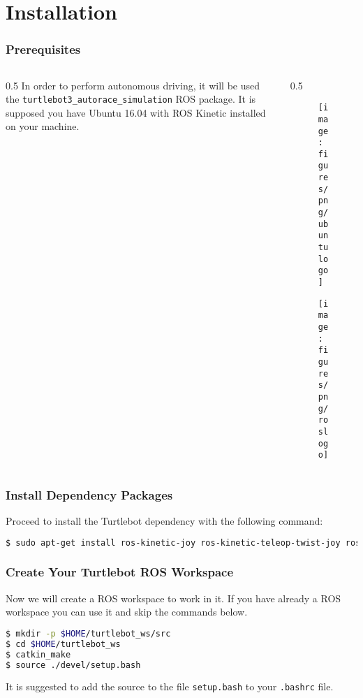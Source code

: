 \section{Installation}


\begin{frame}
\frametitle{Prerequisites}
\begin{columns}
\begin{column}{0.5\textwidth}
	In order to perform autonomous driving, it will be used the \texttt{turtlebot3\_autorace\_simulation} ROS package.
	It is supposed you have Ubuntu 16.04 with ROS Kinetic installed on your machine.
\end{column}
\begin{column}{0.5\textwidth}
	\begin{figure}
		\texttt{[image: figures/png/ubuntulogo]}
	\end{figure}
	\begin{figure}
		\texttt{[image: figures/png/roslogo]}
	\end{figure}
\end{column}
\end{columns}
\end{frame}


\begin{frame}[fragile]
	\frametitle{Install Dependency Packages}
	Proceed to install the Turtlebot dependency with the following command:
	\begin{lstlisting}[language=bash]
$ sudo apt-get install ros-kinetic-joy ros-kinetic-teleop-twist-joy ros-kinetic-teleop-twist-keyboard ros-kinetic-laser-proc ros-kinetic-rgbd-launch ros-kinetic-depthimage-to-laserscan ros-kinetic-rosserial-arduino ros-kinetic-rosserial-python ros-kinetic-rosserial-server ros-kinetic-rosserial-client ros-kinetic-rosserial-msgs ros-kinetic-amcl ros-kinetic-map-server ros-kinetic-move-base ros-kinetic-urdf ros-kinetic-xacro ros-kinetic-compressed-image-transport ros-kinetic-rqt-image-view ros-kinetic-gmapping ros-kinetic-navigation ros-kinetic-interactive-markers
	\end{lstlisting}
\end{frame}


\begin{frame}[fragile]
	\frametitle{Create Your Turtlebot ROS Workspace}
	Now we will create a ROS workspace to work in it. If you have already a ROS workspace you can use it and skip the commands below.
\begin{lstlisting}[language=bash]
$ mkdir -p $HOME/turtlebot_ws/src
$ cd $HOME/turtlebot_ws
$ catkin_make
$ source ./devel/setup.bash
\end{lstlisting}
It is suggested to add the source to the file \verb$setup.bash$ to your \verb$.bashrc$ file.
\end{frame}

